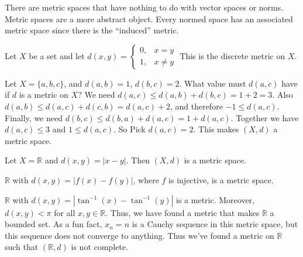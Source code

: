 \documentclass[crop=false,class=article,oneside]{standalone}
\begin{document}
            There are metric spaces that have nothing to do
            with vector spaces or norms. Metric spaces are
            a more abstract object. Every normed space
            has an associated metric space since there
            is the ``induced'' metric.
            \begin{example}
                Let $X$ be a set and let
                $d(x,y)=\begin{cases}%
                            0,&x=y\\%
                            1,&{x}\ne{y}%
                        \end{cases}$
                This is the discrete metric on $X$.
            \end{example}
            \begin{example}
                Let $X=\{a,b,c\}$, and
                $d(a,b)=1$, $d(b,c)=2$. What value
                must $d(a,c)$ have if $d$ is a metric on $X$?
                We need $d(a,c)\leq{d(a,b)+d(b,c)}=1+2=3$.
                Also $d(a,b)\leq{d(a,c)+d(c,b)}=d(a,c)+2$, and
                therefore $-1\leq{d(a,c)}$. Finally, we need
                $d(b,c)\leq{d(b,a)+d(a,c)}=1+d(a,c)$. Together
                we have $d(a,c)\leq{3}$ and $1\leq{d(a,c)}$. So
                Pick $d(a,c)=2$.
                This makes $(X,d)$ a metric space.
            \end{example}
            \begin{example}
                Let $X=\mathbb{R}$ and $d(x,y)=|x-y|$.
                Then $(X,d)$ is a metric space.
            \end{example}
            \begin{example}
                $\mathbb{R}$ with
                $d(x,y)=|f(x)-f(y)|$, where
                $f$ is injective, is a metric space.
            \end{example}
            \begin{example}
                $\mathbb{R}$ with
                $d(x,y)=|\tan^{-1}(x)-\tan^{-1}(y)|$ is a
                metric. Moreover, $d(x,y)<\pi$ for all
                $x,y\in\mathbb{R}$. Thus, we have found
                a metric that makes $\mathbb{R}$ a bounded
                set. As a fun fact, $x_{n}=n$ is a Cauchy
                sequence in this metric space, but
                this sequence does not converge to anything.
                Thus we've found a metric on
                $\mathbb{R}$ such that
                $(\mathbb{R},d)$ is not complete.
            \end{example}
\end{document}
